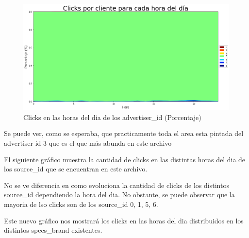 \documentclass[a4paper, 12pt]{article}
\newcommand\tab[1][1cm]{\hspace*{#1}}
\begin{document}
		\FloatBarrier
		\begin{figure}[h]
			\centering
			\includegraphics[width=\textwidth]{images/clicks/clicks_advertiser_id_hours_persentage.png}
			\caption{Clicks en las horas del dia de los advertiser\_id (Porcentaje)}
		\end{figure}
		\FloatBarrier



		\tab Se puede ver, como se esperaba, que practicamente toda el area esta pintada del advertiser id 3 que es el que más abunda en este archivo

		\tab El siguiente gráfico muestra la cantidad de clicks en las distintas horas del dia de los source\_id que se encuentran en este archivo.

	
		\tab No se ve diferencia en como evoluciona la cantidad de clicks de los distintos source\_id dependiendo la hora del dia. No obstante, se puede observar que la mayoria de lso clicks son de los source\_id 0, 1, 5, 6.

		
		\tab Este nuevo gráfico nos mostrará los clicks en las horas del dia distribuidos en los distintos specs\_brand existentes.
\end{document}
